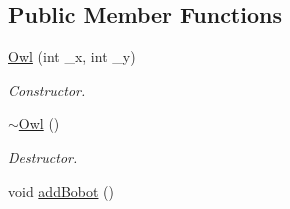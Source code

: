 \subsection*{Public Member Functions}
\begin{DoxyCompactItemize}
\item 
\hyperlink{classOwl_a47aecdab1457c845171932653951a1ff}{Owl} (int \-\_\-x, int \-\_\-y)
\begin{DoxyCompactList}\small\item\em Constructor. \end{DoxyCompactList}\item 
\hypertarget{classOwl_af4fdeb54c20c5b9f3ad8aa96bf4324ca}{\hyperlink{classOwl_af4fdeb54c20c5b9f3ad8aa96bf4324ca}{$\sim$\-Owl} ()}\label{classOwl_af4fdeb54c20c5b9f3ad8aa96bf4324ca}

\begin{DoxyCompactList}\small\item\em Destructor. \end{DoxyCompactList}\item 
\hypertarget{classOwl_a168bc318f54f3add5211957d0575aaf2}{void \hyperlink{classOwl_a168bc318f54f3add5211957d0575aaf2}{add\-Bobot} ()}\label{classOwl_a168bc318f54f3add5211957d0575aaf2}


\end{DoxyCompactItemize}
